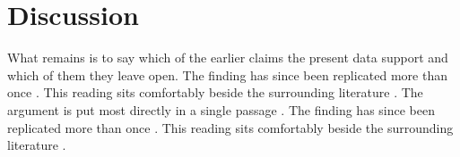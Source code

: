 \documentclass{article}
\begin{document}
\section{Discussion}
What remains is to say which of the earlier claims the present data support and which of them they leave open. The finding has since been replicated more than once \parencite{butler1990gender,debeauvoir2011secondsex}. This reading sits comfortably beside the surrounding literature \parencite{barthes1977deathauthor}. The argument is put most directly in a single passage \parencite[p.~14]{eco1989openwork}. The finding has since been replicated more than once \parencite{otto1958idea,schleiermacher1988onreligion}. This reading sits comfortably beside the surrounding literature \parencite{aquinas1981summa}.

\printbibliography
\end{document}
